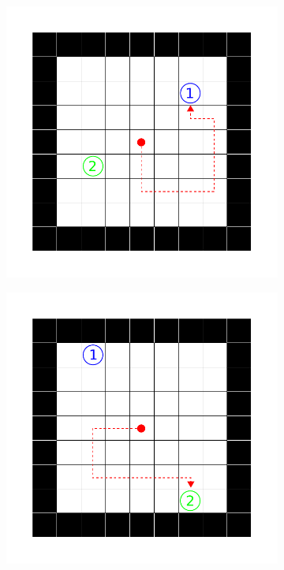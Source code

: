 \begin{figure}[ht!]
  \begin{subfigure}[c]{0.5\textwidth}
    \includegraphics[keepaspectratio,width=\textwidth]{abbildungen/sample_not_seen.pdf}
    \subcaption{}
    \label{sample_visited}
  \end{subfigure}
  \begin{subfigure}[c]{0.5\textwidth}
    \includegraphics[keepaspectratio,width=\textwidth]{abbildungen/sample_visited.pdf}

\end{subfigure}
\end{figure}
